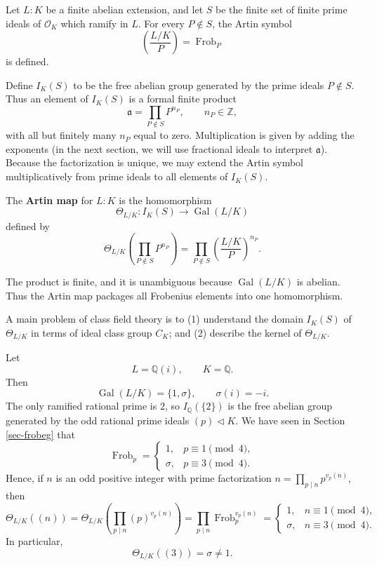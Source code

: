 Let $L:K$ be a finite abelian extension, and let $S$ be the finite set of finite prime ideals
of $\mathcal O_K$ which ramify in $L$. For every $P\notin S$, the Artin symbol
\[
\left(\frac{L/K}{P}\right)=\operatorname{Frob}_P
\]
is defined.

Define $I_K(S)$ to be the free abelian
group generated by the prime ideals $P\notin S$. Thus an element of $I_K(S)$ is a formal
finite product
\[
\mathfrak a=\prod_{P\notin S}P^{n_P},
\qquad n_P\in\mathbb Z,
\]
with all but finitely many $n_P$ equal to zero. Multiplication is given by adding the
exponents  (in the next section, we will use fractional ideals to interpret $\mathfrak a$). Because the factorization is unique, we may extend the Artin symbol
multiplicatively from prime ideals to all elements of $I_K(S)$.

\begin{definition}\label{def-ArtinMap}
The {\bf Artin map} for $L:K$ is the homomorphism
\[
\Theta_{L/K}:I_K(S)\longrightarrow\operatorname{Gal}(L/K)
\]
defined by
\[
\boxed{
\Theta_{L/K}\left(\prod_{P\notin S}P^{n_P}\right)
=
\prod_{P\notin S}
\left(\frac{L/K}{P}\right)^{n_P}.}
\]
\end{definition}

The product is finite, and it is unambiguous because $\operatorname{Gal}(L/K)$ is abelian.
Thus the Artin map packages all Frobenius elements into one homomorphism. 

A main problem of class field theory is to (1) understand the domain $I_K(S)$ of $\Theta_{L/K}$ in terms of ideal class group $C_K$; and (2) describe the kernel of $\Theta_{L/K}$.

\begin{example}\label{eg-ArtinQi}
Let
\[
L=\mathbb Q(i),
\qquad
K=\mathbb Q.
\]
Then
\[
\operatorname{Gal}(L/K)=\{1,\sigma\},
\qquad
\sigma(i)=-i.
\]
The only ramified rational prime is $2$, so $I_{\mathbb Q}(\{2\})$ is the free abelian group
generated by the odd rational prime ideals $(p) \lhd K$. We have seen in Section \ref{sec-frobeg} that
\[
\operatorname{Frob}_p=
\begin{cases}
1,&p\equiv1\pmod4,\\
\sigma,&p\equiv3\pmod4.
\end{cases}
\]
Hence, if $n$ is an odd positive integer with prime factorization
\(n=\prod_{p\mid n}p^{v_p(n)},
\) then
\[\boxed{
\Theta_{L/K}\left((n)\right) = \Theta_{L/K}\left(\prod_{p\mid n}(p)^{v_p(n)}\right)
=
\prod_{p\mid n}\operatorname{Frob}_p^{v_p(n)}
=
\begin{cases}
1,&n\equiv1\pmod4,\\
\sigma,&n\equiv3\pmod4.
\end{cases}}
\]
In particular,
\[
\Theta_{L/K}((3))=\sigma\neq1.
\]
\end{example}

